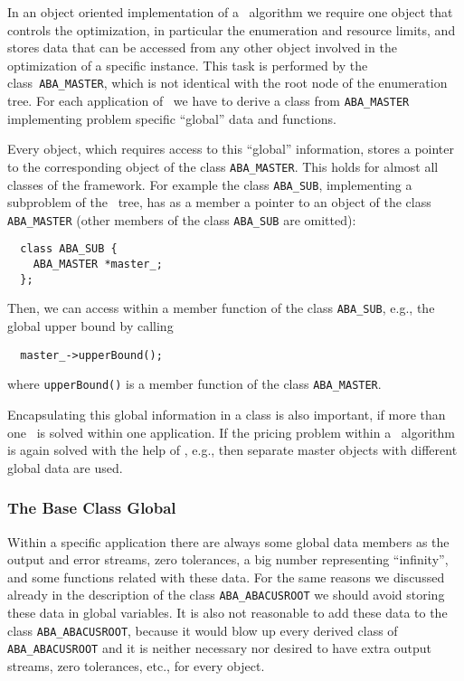 In an object oriented implementation of a \lpbab\ algorithm we require
one object that controls the optimization, in particular
the enumeration and resource limits, and stores data that can be
accessed from any other object involved in the optimization of a specific
instance.
This task is performed by the class~{\tt ABA\_MASTER},
which is not identical with the root node of the enumeration tree. For each
application of \ABACUS\ we have to derive a class from {\tt ABA\_MASTER}
implementing problem specific ``global'' data and functions.

Every object,
which requires access to this ``global'' information, stores a pointer
to the corresponding object of the class {\tt ABA\_MASTER}. This holds for
almost all classes of the framework.
For example the class {\tt ABA\_SUB}, implementing a subproblem of the
\bab\ tree, has as a member a pointer to an object of the class
{\tt ABA\_MASTER} (other members of the class {\tt ABA\_SUB} are omitted):
\begin{verbatim}
  class ABA_SUB {
    ABA_MASTER *master_;
  };
\end{verbatim}
Then, we can access within a member function of the class {\tt ABA\_SUB}, e.g., the
global upper bound by calling
\begin{verbatim}
  master_->upperBound();
\end{verbatim}
where {\tt upperBound()} is a member function of the class {\tt ABA\_MASTER}.

Encapsulating this global information in a class is also important,
if more than one \lpbab\ is solved within one application.
If the pricing problem within a \bap\ algorithm
is again solved with the help of \ABACUS, e.g., then separate master
objects with different global data 
are used.

\subsubsection{The Base Class Global}

Within a specific application there are always some global data members
as the output and error streams, zero tolerances, a big
number representing ``infinity'', and some functions related with these
data. For the same reasons we discussed  already in the description of 
the class {\tt ABA\_ABACUSROOT} we should avoid storing these data in
global variables.
It is also not reasonable to add these data to the class {\tt ABA\_ABACUSROOT},
because it would blow up every derived class of {\tt ABA\_ABACUSROOT} and it
is neither necessary nor desired to have extra output streams,
zero tolerances, etc., for every object.

